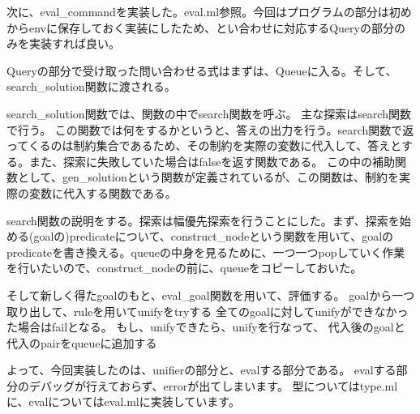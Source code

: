 \documentclass[uplatex,12pt]{jsarticle}
\begin{document}
次に、eval\_commandを実装した。eval.ml参照。今回はプログラムの部分は初めからenvに保存しておく実装にしたため、とい合わせに対応するQueryの部分のみを実装すれば良い。

Queryの部分で受け取った問い合わせる式はまずは、Queueに入る。そして、search\_solution関数に渡される。

search\_solution関数では、関数の中でsearch関数を呼ぶ。
主な探索はsearch関数で行う。
この関数では何をするかというと、答えの出力を行う。search関数で返ってくるのは制約集合であるため、その制約を実際の変数に代入して、答えとする。また、探索に失敗していた場合はfalseを返す関数である。
この中の補助関数として、gen\_solutionという関数が定義されているが、この関数は、制約を実際の変数に代入する関数である。

search関数の説明をする。探索は幅優先探索を行うことにした。まず、探索を始める(goalの)predicateについて、construct\_nodeという関数を用いて、goalのpredicateを書き換える。queueの中身を見るために、一つ一つpopしていく作業を行いたいので、construct\_nodeの前に、queueをコピーしておいた。

そして新しく得たgoalのもと、eval\_goal関数を用いて、評価する。
goalから一つ取り出して、ruleを用いてunifyをtryする
全てのgoalに対してunifyができなかった場合はfailとなる。
もし、unifyできたら、unifyを行なって、
代入後のgoalと代入のpairをqueueに追加する

よって、今回実装したのは、unifierの部分と、evalする部分である。
evalする部分のデバッグが行えておらず、errorが出てしまいます。
型についてはtype.mlに、evalについてはeval.mlに実装しています。
\end{document}

